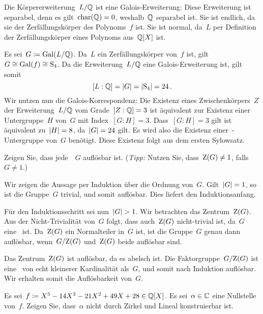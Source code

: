 \documentclass{scrartcl}
\begin{document}
\begin{solution}
  Die Körpererweiterung~$L/\mathbb{Q}$ ist eine Galois-Erweiterung:
  Diese Erweiterung ist separabel, denn es gilt~$\operatorname{char}(\mathbb{Q}) = 0$, weshalb~$\mathbb{Q}$ separabel ist.
  Sie ist endlich, da sie der Zerfällungskörper des Polynoms~$f$ ist.
  Sie ist normal, da~$L$ per Definition der Zerfällungskörper eines Polynoms aus~$\mathbb{Q}[X]$ ist.

  Es sei~$G \coloneqq \operatorname{Gal}(L / \mathbb{Q})$.
  Da~$L$ ein Zerfällungskörper von~$f$ ist, gilt~$G \cong \operatorname{Gal}(f) \cong \operatorname{S}_4$.
  Da die Erweiterung~$L/\mathbb{Q}$ eine Galois-Erweiterung ist, gilt somit
  \[
    [L : \mathbb{Q}]
    =
    \lvert G \rvert
    =
    \lvert \operatorname{S}_4 \rvert
    =
    24 \,.
  \]
  Wir nutzen nun die Galois-Korrespondenz:
  Die Existenz eines Zwischenkörpers~$Z$ der Erweiterung~$L / \mathbb{Q}$ vom Grade~$[Z : \mathbb{Q}] = 3$ ist äquivalent zur Existenz einer Untergruppe~$H$ von~$G$ mit Index~$[G : H] = 3$.
  Dass~$[G : H] = 3$ gilt ist äquivalent zu~$\lvert H\rvert = 8$, da~$\lvert G\rvert = 24$ gilt.
  Es wird also die Existenz einer~-Untergruppe von~$G$ benötigt.
  Diese Existenz folgt aus dem ersten Sylowsatz.
\end{solution}

\begin{exercise}
  Zeigen Sie, dass jede~~$G$ auflösbar ist.
  (\emph{Tipp:} Nutzen Sie, dass~$\operatorname{Z}(G) \neq 1$, falls~$G \neq 1$.)
\end{exercise}

\begin{solution}
  Wir zeigen die Aussage per Induktion über die Ordnung von~$G$.
  Gilt~$\lvert G\rvert = 1$, so ist die Gruppe~$G$ trivial, und somit auflösbar.
  Dies liefert den Induktionsanfang.

  Für den Induktionsschritt sei nun~$\lvert G\rvert > 1$.
  Wir betrachten das Zentrum~$\operatorname{Z}(G)$.
  Aus der Nicht-Trivialität von~$G$ folgt, dass auch~$\operatorname{Z}(G)$ nicht-trivial ist, da~$G$ eine~ ist.
  Da~$\operatorname{Z}(G)$ ein Normalteiler in~$G$ ist, ist die Gruppe~$G$ genau dann auflösbar, wenn~$G/{\operatorname{Z}(G)}$ und~$\operatorname{Z}(G)$ beide auflösbar sind.

  Das Zentrum~$\operatorname{Z}(G)$ ist auflösbar, da es abelsch ist.
  Die Faktorgruppe~$G/{\operatorname{Z}(G)}$ ist eine~ von echt kleinerer Kardinalität als~$G$, und somit nach Induktion auflösbar.
  Wir erhalten somit die Auflösbarkeit von~$G$.
\end{solution}

\begin{exercise}[subtitle = {Erstklausur~19/20}]
  Es sei~$f \coloneqq X^5 - 14 X^3 - 21 X^2 + 49 X + 28 \in \mathbb{Q}[X]$.
  Es sei~$\alpha \in \mathbb{C}$ eine Nullstelle von~$f$.
  Zeigen Sie, dass~$\alpha$ nicht durch Zirkel und Lineal konstruierbar ist.
\end{exercise}
\end{document}

